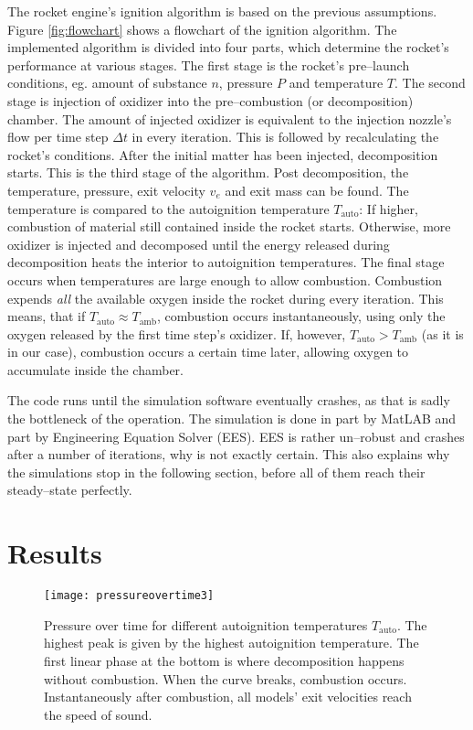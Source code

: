   The rocket engine's ignition algorithm is based on the previous assumptions. Figure \ref{fig:flowchart} shows a flowchart of the ignition algorithm. The implemented algorithm is divided into four parts, which determine the rocket's performance at various stages. The first stage is the rocket's pre--launch conditions, eg. amount of substance $n$, pressure $P$ and temperature $T$. The second stage is injection of oxidizer into the pre--combustion (or decomposition) chamber. The amount of injected oxidizer is equivalent to the injection nozzle's flow per time step $\Delta t$ in every iteration. This is followed by recalculating the rocket's conditions. After the initial matter has been injected, decomposition starts. This is the third stage of the algorithm. Post decomposition, the temperature, pressure, exit velocity $v_e$ and exit mass can be found. The temperature is compared to the autoignition temperature $T_\text{auto}$: If higher, combustion of material still contained inside the rocket starts. Otherwise, more oxidizer is injected and decomposed until the energy released during decomposition heats the interior to autoignition temperatures. The final stage occurs when temperatures are large enough to allow combustion. Combustion expends \emph{all} the available oxygen inside the rocket during every iteration. This means, that if $T_\text{auto} \approx T_\text{amb}$, combustion occurs instantaneously, using only the oxygen released by the first time step's oxidizer. If, however, $T_\text{auto} > T_\text{amb}$ (as it is in our case), combustion occurs a certain time later, allowing oxygen to accumulate inside the chamber.
  
  The code runs until the simulation software eventually crashes, as that is sadly the bottleneck of the operation. The simulation is done in part by MatLAB and part by Engineering Equation Solver (EES). EES is rather un--robust and crashes after a number of iterations, why is not exactly certain. This also explains why the simulations stop in the following section, before all of them reach their steady--state perfectly.

\section{Results}

  \begin{figure}
  	\centering
  	\texttt{[image: pressureovertime3]}
  	\caption{Pressure over time for different autoignition temperatures $T_\text{auto}$. The highest peak is given by the highest autoignition temperature. The first linear phase at the bottom is where decomposition happens without combustion. When the curve breaks, combustion occurs. Instantaneously after combustion, all models' exit velocities reach the speed of sound.}
  	\label{fig:pressureovertime}
  \end{figure}

